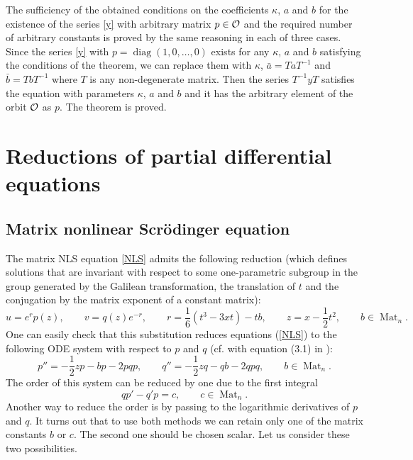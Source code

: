 \documentclass{article}
\theoremstyle{plain}
\theoremstyle{definition}
\DeclareMathOperator{\diag}{diag}
\DeclareMathOperator{\Mat}{Mat}
\begin{document}
The sufficiency of the obtained conditions on the coefficients $\kappa$, $a$ and $b$ for the existence of the series \eqref{y} with arbitrary matrix $p\in{\cal O}$ and the required number of arbitrary constants is proved by the same reasoning in each of three cases. Since the series \eqref{y} with $p=\diag(1,0,\dots,0)$ exists for any  $\kappa$, $a$ and $b$ satisfying the conditions of the theorem, we can replace them with $\kappa$, $\bar a = T a T^{-1}$ and $\bar b=T b T^{-1}$ where $T$ is any non-degenerate matrix. Then the series $T^{-1} y T$ satisfies the equation with parameters $\kappa$, $a$ and $b$ and it has the arbitrary element of the orbit ${\cal O}$ as $p$. \qquad The theorem is proved.

\section{Reductions of partial differential equations}

\subsection{Matrix nonlinear Scr\"odinger equation}

The matrix NLS equation \eqref{NLS} admits the following reduction (which defines solutions that are invariant with respect to some one-parametric subgroup in the group generated by the Galilean transformation, the translation of $t$ and the conjugation by the matrix exponent of a constant matrix):
\begin{equation}\label{NLS.Gal}
 u=e^rp(z),\qquad v=q(z)e^{-r},\qquad r=\frac{1}{6}(t^3-3xt)-tb,\qquad z=x-\frac{1}{2}t^2,\qquad b\in\Mat_n.     
\end{equation}
One can easily check that this substitution reduces equations (\ref{NLS}) to the following ODE system with respect to $p$ and $q$ (cf. with equation (3.1) in \cite{Retakh_Rubtsov_2010}):
\begin{equation}\label{NLS.red}
 p''= -\frac{1}{2}zp-bp-2pqp,\qquad q''= -\frac{1}{2}zq-qb-2qpq,\qquad b\in\Mat_n. 
\end{equation}
The order of this system can be reduced by one due to the first integral
\begin{equation}\label{NLS.int}
 qp'-q'p=c,\qquad c\in\Mat_n.
\end{equation}
Another way to reduce the order is by passing to the logarithmic derivatives of $p$ and $q$. It turns out that to use both methods we can retain only one of the matrix constants $b$ or $c$. The second one should be chosen scalar. Let us consider these two possibilities.
\medskip
\end{document}
